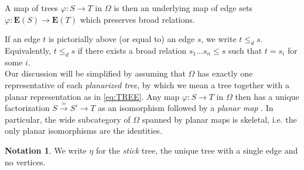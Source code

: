 \documentclass{hha}
\theoremstyle{definition} %
\newtheorem{notation}[theorem]{Notation}%
\begin{document}
A map of trees $\varphi \colon S \to T$
in $\Omega$ is then an underlying map
of edge sets 
$\varphi \colon \boldsymbol{E}(S) \to \boldsymbol{E}(T)$
which preserves broad relations.

If an edge $t$ is pictorially above (or equal to) an edge $s$, we write $t \leq_d s$.
Equivalently, $t \leq_d s$ if there exists a broad relation $s_1\dots s_n \leq s$ such that $t = s_i$ for some $i$.\\

Our discussion will be simplified by assuming 
that $\Omega$ has exactly one representative of 
each \emph{planarized tree},
by which we mean a tree together with a planar representation as in \eqref{eq:TREE}.
Any map  
$\varphi \colon S \to T$ in $\Omega$
then has a unique factorization
$S \xrightarrow{\simeq} S' \to T$
as an isomorphism followed by a \emph{planar map}
\cite[Prop. 3.24]{BP_geo}.
In particular, the wide subcategory of $\Omega$ spanned by planar maps is skeletal,
i.e. the only planar isomorphisms are the identities.




\begin{notation}
	We write $\eta$ for the \textit{stick} tree, the unique tree with a single edge and no vertices.
\end{notation}
\end{document}
